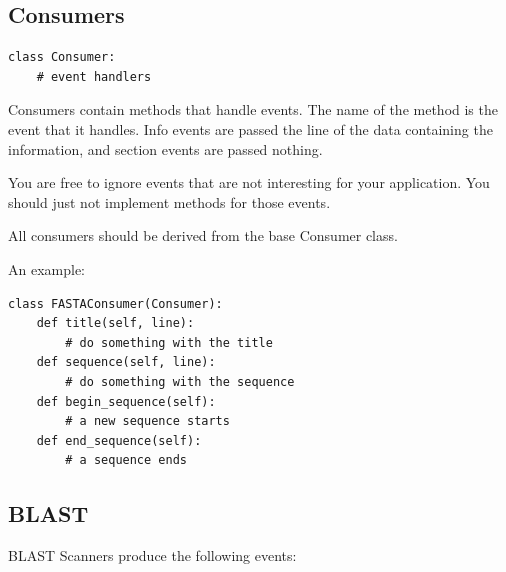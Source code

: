 \documentclass{report}
\begin{document}
\subsection{Consumers}

\begin{verbatim}
class Consumer:
    # event handlers
\end{verbatim}


Consumers contain methods that handle events.  The name of the method
is the event that it handles.  Info events are passed the line of the
data containing the information, and section events are passed
nothing.


You are free to ignore events that are not interesting for your
application.  You should just not implement methods for those events.


All consumers should be derived from the base Consumer class.


An example:


\begin{verbatim}
class FASTAConsumer(Consumer):
    def title(self, line):
        # do something with the title
    def sequence(self, line):
        # do something with the sequence
    def begin_sequence(self):
        # a new sequence starts
    def end_sequence(self):
        # a sequence ends
\end{verbatim}


\subsection{BLAST}

BLAST Scanners produce the following events:
\end{document}
